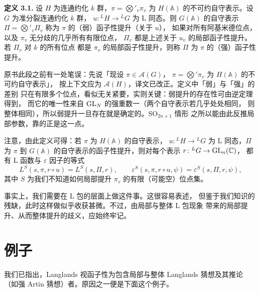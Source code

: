 \par\medskip\noindent\textbf{定义 3.1.}\quad
设 $H$ 为连通约化 $k$ 群，$\pi=\bigotimes'_v\pi_v$ 为 $H(\mathbb{A})$
的不可约自守表示。设 $G$ 为准分裂连通约化 $k$ 群，
$u\colon{}^{L}H\to{}^{L}G$ 为 L 同态。则 $G(\mathbb{A})$ 的自守表示
$\Pi=\bigotimes'_v\Pi_v$ 称为 $\pi$ 的（弱）函子性提升（关于 $u$），
如果对所有阿基米德位点，以及 $\pi_v$ 无分歧的几乎所有有限位点，
$\Pi_v$ 都是上述关于 $u_v$ 的局部函子性提升。若 $\Pi_v$ 对 $k$ 的所有位点
都是 $\pi_v$ 的局部函子性提升，则称 $\Pi$ 为 $\pi$ 的（强）函子性提升。
\begin{annote}
原书此段之前有一处笔误：先说「现设 $\pi\in\mathcal{A}(G)$，
$\pi=\bigotimes'\pi_v$ 为 $H(\mathbb{A})$ 的不可约自守表示」，
按上下文应为 $\mathcal{A}(H)$，译文已改正。定义中「弱」与「强」的差别
只在有限多个位点，看似无关紧要，实则关键：弱提升的存在性可由逆定理得到，
而它的唯一性来自 $\mathrm{GL}_N$ 的强重数一（两个自守表示若几乎处处相同，
则整体相同），所以弱提升一旦存在就是确定的。$\mathrm{SO}_{2n+1}$ 情形
之所以能由此反推局部参数，靠的正是这一点。
\par{}
\end{annote}

注意，由此定义可得：若 $\pi$ 为 $H(\mathbb{A})$ 的自守表示，
$u\colon{}^{L}H\to{}^{L}G$ 为 L 同态，$\Pi$ 为 $\pi$ 到 $G(\mathbb{A})$
的自守表示的函子性提升，则对每个表示 $r\colon{}^{L}G\to\mathrm{GL}_n(\mathbb{C})$，
都有 L 函数与 $\varepsilon$ 因子的等式
\[
  L^{S}(s,\pi,r\circ u)=L^{S}(s,\Pi,r),\qquad
  \varepsilon^{S}(s,\pi,r\circ u,\psi)=\varepsilon^{S}(s,\Pi,r,\psi),
\]
其中 $S$ 为我们不知道如何局部提升 $\pi_v$ 的有限（可能空）位点集。

事实上，我们需要在 L 包的层面上做这件事。这很容易表述，
但鉴于我们知识的残缺，此时这样做似乎收获甚微。不过，由局部与整体 L 包现象
带来的局部提升、从而整体提升的歧义，应始终牢记。

\section{例子}

我们已指出，Langlands 视函子性为包含局部与整体 Langlands 猜想及其推论
（如强 Artin 猜想）者。原因之一便是下面这个例子。

